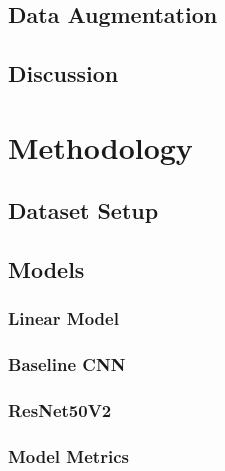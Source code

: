 \documentclass[biblatexBackend=bibtex]{tumthesis}
\begin{document}
\section{Data Augmentation}
\label{sec:dataset:data_augmentation}


\section{Discussion}
\label{sec:dataset:discussion}


\chapter{Methodology}
\label{ch:methodology}


\section{Dataset Setup}
\label{sec:methodology:tfds}


\section{Models}
\label{sec:methodology:models}


\subsection{Linear Model}
\label{sec:methodology:lm}

\subsection{Baseline CNN}
\label{sec:methodology:BL_CNN}

\subsection{ResNet50V2}
\label{sec:methodology:RN50V2}

\subsection{Model Metrics}
\label{sec:methodology:metrics}
\end{document}
